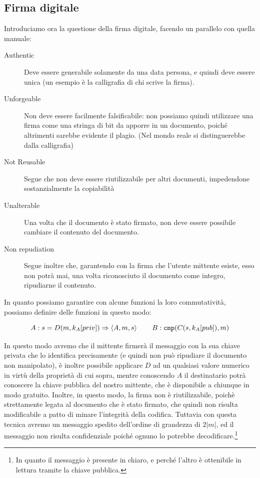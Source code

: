 \subsection{Firma digitale}
Introduciamo ora la questione della firma digitale, facendo un parallelo
con quella manuale:
\begin{description}
\item[Authentic] Deve essere generabile solamente da una data persona, e quindi
	deve essere unica (un esempio è la calligrafia di chi scrive la firma).
\item[Unforgeable] Non deve essere facilmente falsificabile: non
	possiamo quindi utilizzare una firma come una stringa di bit da apporre
	in un documento, poiché altrimenti sarebbe evidente il plagio. (Nel mondo
	reale si distinguerebbe dalla calligrafia)
\item[Not Reusable] Segue che non deve essere riutilizzabile per altri
	documenti, impedendone sostanzialmente la copiabilità
\item[Unalterable] Una volta che il documento è stato firmato, non deve essere
	possibile cambiare il contenuto del documento.
\item[Non repudiation] Segue inoltre che, garantendo con la firma che l'utente
	mittente esiste, esso non potrà mai, una volta riconosciuto il documento
	come integro, ripudiarne il contenuto.
\end{description}

In quanto possiamo garantire con alcune funzioni la loro commutatività,
possiamo definire delle funzioni in questo modo:

\[A:s=D(m,k_A[priv])\Rightarrow \Braket{A,m,s}\quad\quad B:\mathtt{cmp}(C(s,k_A[pub]),m)\]

In questo modo avremo che il mittente firmerà il messaggio con la sua chiave privata
che lo identifica precisamente (e quindi non può ripudiare il documento non manipolato),
 è inoltre possibile applicare $D$ ad un qualsiasi 
valore numerico in virtù della proprietà di cui sopra, mentre conoscendo
$A$ il destinatario potrà conoscere la chiave pubblica del nostro mittente, che 
è disponibile a chiunque in modo gratuito.
Inoltre, in questo modo, la firma non è riutilizzabile, poichè strettamente 
legata al documento che è stato firmato, che quindi non risulta modificabile
a patto di minare l'integrità della codifica. 
Tuttavia con questa tecnica avremo un messaggio spedito dell'ordine di grandezza
di $2|m|$, ed il messaggio non risulta confidenziale poiché ognuno lo potrebbe
decodificare.\footnote{In quanto il messaggio è presente in chiaro, e perché
l'altro è ottenibile in lettura tramite la chiave pubblica.}

